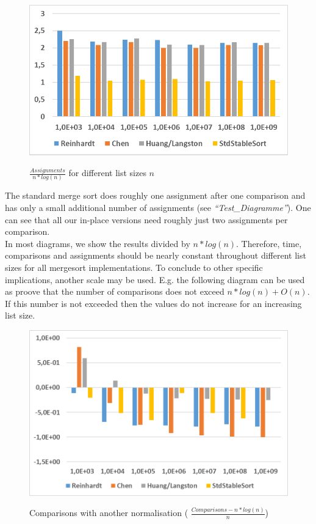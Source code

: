 \documentclass[11pt,pdftex,a4paper, twocolumn]{article}
\begin{document}
\begin{figure}[H]
\includegraphics[width=\linewidth]{Diagramm-Bilder/ints-assignments.JPG} \\
\caption{ $ \frac{Assignments}{n*log(n)} $ for different list sizes $ n $ } \label{fig:ints-assign}
\end{figure}
The standard merge sort does roughly one assignment after one comparison and has only a small additional number of assignments (see \textit{“Test\_Diagramme”}). One can see that all our in-place versions need roughly just two assignments per comparison. \\
In most diagrams, we show the results divided by $ n*log(n) $. Therefore, time, comparisons and assignments should be nearly constant throughout different list sizes for all mergesort implementations. To conclude to other specific implications, another scale may be used. E.g. the following diagram can be used as proove that the number of comparisons does not exceed $ n*log(n) + O(n) $. If this number is not exceeded then the values do not increase for an increasing list size. \\
\begin{figure}[H]
\includegraphics[width=\linewidth]{Diagramm-Bilder/ints-time-otherNormalization.JPG} \\
\caption{Comparisons with another normalisation ( $ \frac{Comparisons - n*log(n)}{n} $)} \label{fig:ints-time-otherNormalization}
\end{figure}
\end{document}
